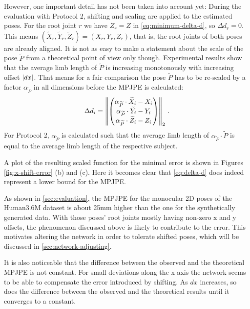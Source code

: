 However, one important detail has not been taken into account yet:
During the evaluation with Protocol 2, shifting and scaling are applied to the estimated poses. 
For the root joint $r$ we have $Z_r = Z$ in \autoref{eq:minimum-delta-d}, so $\Delta d_r = 0$. 
This means $(\widetilde{X}_r, \widetilde{Y}_r, \widetilde{Z}_r) = (X_r, Y_r, Z_r)$, that is, the root joints of both poses are already aligned.
It is not as easy to make a statement about the scale of the pose $\widetilde{P}$ from a theoretical point of view only though.
Experimental results show that the average limb length of $\widetilde{P}$ is increasing monotonously with increasing offset $\abs{dx}$.
That means for a fair comparison the pose $\widetilde{P}$ has to be re-scaled by a factor $\alpha_{\widetilde{P}}$ in all dimensions before the MPJPE is calculated:
\begin{equation}
	\Delta d_i = \norm{ 
	\begin{pmatrix}
		\alpha_{\widetilde{P}} \cdot \widetilde{X}_i - X_i \\
		\alpha_{\widetilde{P}} \cdot \widetilde{Y}_i - Y_i \\
		\alpha_{\widetilde{P}} \cdot \widetilde{Z}_i - Z_i
	\end{pmatrix}
	}_2 \ .
\end{equation}
For Protocol 2, $\alpha_{\widetilde{P}}$ is calculated such that the average limb length of $\alpha_{\widetilde{P}} \cdot \widetilde{P}$ is equal to the average limb length of the respective subject.


 
A plot of the resulting scaled function for the minimal error is shown in Figures \ref{fig:x-shift-error} (b) and (c).
Here it becomes clear that \autoref{eq:delta-d} does indeed represent a lower bound for the MPJPE.

As shown in \autoref{sec:evaluation}, the MPJPE for the monocular 2D poses of the Human3.6M dataset is about 25mm higher than the one for the synthetically generated data.
With those poses' root joints mostly having non-zero x and y offsets, the phenomenon discussed above is likely to contribute to the error.
This motivates altering the network in order to tolerate shifted poses, which will be discussed in \autoref{sec:network-adjusting}.

It is also noticeable that the difference between the observed and the theoretical MPJPE is not constant.
For small deviations along the x axis the network seems to be able to compensate the error introduced by shifting.
As $dx$ increases, so does the difference between the observed and the theoretical results until it converges to a constant.

